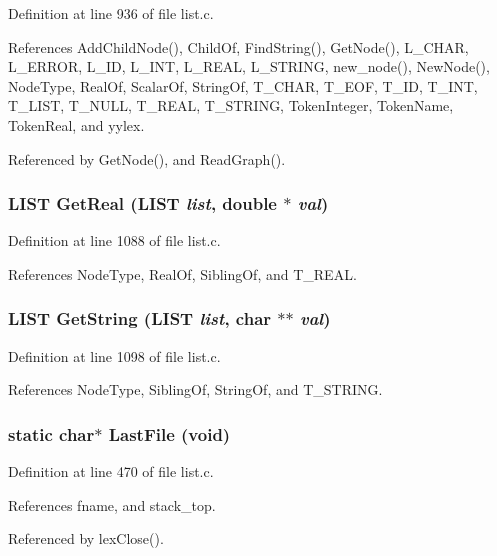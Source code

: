 Definition at line 936 of file list.c.

References Add\-Child\-Node(), Child\-Of, Find\-String(), Get\-Node(), L\_\-CHAR, L\_\-ERROR, L\_\-ID, L\_\-INT, L\_\-REAL, L\_\-STRING, new\_\-node(), New\-Node(), Node\-Type, Real\-Of, Scalar\-Of, String\-Of, T\_\-CHAR, T\_\-EOF, T\_\-ID, T\_\-INT, T\_\-LIST, T\_\-NULL, T\_\-REAL, T\_\-STRING, Token\-Integer, Token\-Name, Token\-Real, and yylex.

Referenced by Get\-Node(), and Read\-Graph().
\subsubsection{\setlength{\rightskip}{0pt plus 5cm}\bf{LIST} Get\-Real (\bf{LIST} {\em list}, double $\ast$ {\em val})}\label{list_8c_c6e4ef39bbdabddec435b0fb40116354}




Definition at line 1088 of file list.c.

References Node\-Type, Real\-Of, Sibling\-Of, and T\_\-REAL.
\subsubsection{\setlength{\rightskip}{0pt plus 5cm}\bf{LIST} Get\-String (\bf{LIST} {\em list}, char $\ast$$\ast$ {\em val})}\label{list_8c_20272db4a1f8faaab032a53689f15ebd}




Definition at line 1098 of file list.c.

References Node\-Type, Sibling\-Of, String\-Of, and T\_\-STRING.
\subsubsection{\setlength{\rightskip}{0pt plus 5cm}static char$\ast$ Last\-File (void)\hspace{0.3cm}{\tt  [static]}}\label{list_8c_1c995961755fb61d0e4b2014f4324324}




Definition at line 470 of file list.c.

References fname, and stack\_\-top.

Referenced by lex\-Close().

